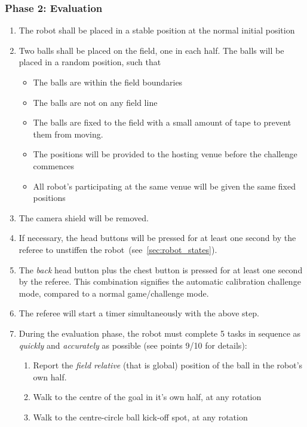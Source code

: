 \subsubsection{Phase 2: Evaluation}

\begin{enumerate}
    \item The robot shall be placed in a stable position at the normal initial position
    \item Two balls shall be placed on the field, one in each half. The balls will be placed in a random position, such that
    \begin{itemize}
        \item The balls are within the field boundaries
        \item The balls are not on any field line
        \item The balls are fixed to the field with a small amount of tape to prevent them from moving.
        \item The positions will be provided to the hosting venue before the challenge commences
        \item All robot's participating at the same venue will be given the same fixed positions
    \end{itemize}
    \item The camera shield will be removed.
    \item If necessary, the head buttons will be pressed for at least one second by the referee to unstiffen the robot~(see~\ref{sec:robot_states}).
    \item The \textit{back} head button plus the chest button is pressed for at least one second by the referee. This combination signifies the automatic calibration challenge mode, compared to a normal game/challenge mode.
    \item The referee will start a timer simultaneously with the above step.
    \item During the evaluation phase, the robot must complete 5 tasks in sequence as \textit{quickly} and \textit{accurately} as possible (see points 9/10 for details):
    \begin{enumerate}
        \item Report the \textit{field relative} (that is global) position of the ball in the robot's own half.
        \item Walk to the centre of the goal in it's own half, at any rotation
        \item Walk to the centre-circle ball kick-off spot, at any rotation

\end{enumerate}
\end{enumerate}
